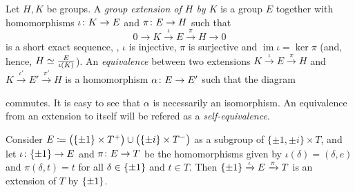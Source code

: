 \begin{defi}
    Let $H, K$ be groups. 
    A \emph{group extension of $H$ by $K$} is a group $E$ together with homomorphisms $\iota\colon K \to E$ and $\pi\colon E \to H$ such that 
    \begin{equation}%
        0 \rightarrow K \xrightarrow{\iota} E \xrightarrow{\pi} H \rightarrow 0
    \end{equation}
    is a short exact sequence, \ie,
    $\iota$ is injective, $\pi$ is surjective and $\operatorname{im} \iota = \ker \pi$ (and, hence, $H \simeq \frac{E}{\iota(K)}$). 
    An \emph{equivalence} between two extensions $K \xrightarrow{\iota} E \xrightarrow{\pi} H$ and $K \xrightarrow{\iota'} E' \xrightarrow{\pi'} H$ is a homomorphism $\alpha\colon E \to E'$ such that the diagram
	\begin{center}
	\end{center}
	commutes. 
	It is easy to see that $\alpha$ is necessarily an isomorphism. 
	An equivalence from an extension to itself will be refered as a \emph{self-equivalence}.
\end{defi}

\begin{ex}%
    Consider $E \coloneqq \big(\{ \pm 1 \} \times T^+\big) \cup \big(\{\pm i\} \times T^-\big)$ as a subgroup of $\{ \pm 1, \pm i \} \times T$, and let $\iota\colon \{ \pm 1 \} \to E$ and $\pi\colon E \to T$ be the homomorphisms given by $\iota(\delta) = (\delta, e)$ and $\pi (\delta, t) = t$ for all $\delta \in \{ \pm 1 \}$ and $t\in T$. 
    Then $\{ \pm 1 \} \xrightarrow{\iota} E \xrightarrow{\pi} T$ is an extension of $T$ by $\{ \pm 1 \}$.
\end{ex}


